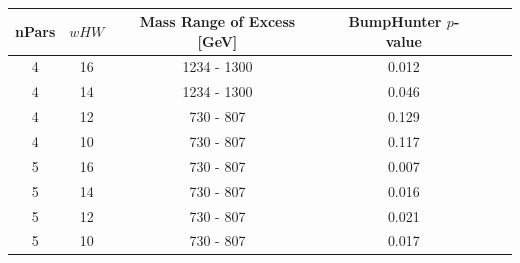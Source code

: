 \begin{table}[!ht]
\centering
\begin{tabular}{|c|c||c|c|c|c|}
  \hline
  nPars & $wHW$  &  Mass Range of Excess [GeV]  &  BumpHunter \mbox{$p$-value} \\
  \hline
   4    & 16   &  1234 - 1300 &  0.012 \\
   4    & 14   &  1234 - 1300 &  0.046 \\
   4    & 12   &   730 - 807  &  0.129 \\
   4    & 10   &   730 - 807  &  0.117 \\
  \hline
   5    & 16   &   730 - 807  &  0.007 \\
   5    & 14   &   730 - 807  &  0.016 \\
   5    & 12   &   730 - 807  &  0.021 \\
   5    & 10   &   730 - 807  &  0.017 \\
  \hline
\end{tabular}
\vspace{10pt}
\caption{\label{tab:bumpH_lm_sigInj_800}}
\end{table}

